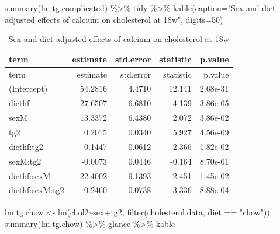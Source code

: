 \documentclass[
]{article}
\newenvironment{Shaded}{\begin{snugshade}}{\end{snugshade}}
\newcommand{\AttributeTok}[1]{\textcolor[rgb]{0.77,0.63,0.00}{#1}}
\newcommand{\DecValTok}[1]{\textcolor[rgb]{0.00,0.00,0.81}{#1}}
\newcommand{\FunctionTok}[1]{\textcolor[rgb]{0.00,0.00,0.00}{#1}}
\newcommand{\NormalTok}[1]{#1}
\newcommand{\OtherTok}[1]{\textcolor[rgb]{0.56,0.35,0.01}{#1}}
\newcommand{\SpecialCharTok}[1]{\textcolor[rgb]{0.00,0.00,0.00}{#1}}
\newcommand{\StringTok}[1]{\textcolor[rgb]{0.31,0.60,0.02}{#1}}
\begin{document}
\begin{Shaded}
\begin{Highlighting}[]
\FunctionTok{summary}\NormalTok{(lm.tg.complicated) }\SpecialCharTok{\%\textgreater{}\%}\NormalTok{ tidy }\SpecialCharTok{\%\textgreater{}\%} \FunctionTok{kable}\NormalTok{(}\AttributeTok{caption=}\StringTok{"Sex and diet adjusted effects of calcium on cholesterol at 18w"}\NormalTok{, }\AttributeTok{digits=}\DecValTok{50}\NormalTok{)}
\end{Highlighting}
\end{Shaded}

\begin{longtable}[]{@{}lrrrr@{}}
\caption{Sex and diet adjusted effects of calcium on cholesterol at
18w}\tabularnewline
\toprule()
term & estimate & std.error & statistic & p.value \\
\midrule()
\endfirsthead
\toprule()
term & estimate & std.error & statistic & p.value \\
\midrule()
\endhead
(Intercept) & 54.2816 & 4.4710 & 12.141 & 2.68e-31 \\
diethf & 27.6507 & 6.6810 & 4.139 & 3.86e-05 \\
sexM & 13.3372 & 6.4380 & 2.072 & 3.86e-02 \\
tg2 & 0.2015 & 0.0340 & 5.927 & 4.56e-09 \\
diethf:tg2 & 0.1447 & 0.0612 & 2.366 & 1.82e-02 \\
sexM:tg2 & -0.0073 & 0.0446 & -0.164 & 8.70e-01 \\
diethf:sexM & 22.4002 & 9.1393 & 2.451 & 1.45e-02 \\
diethf:sexM:tg2 & -0.2460 & 0.0738 & -3.336 & 8.88e-04 \\
\bottomrule()
\end{longtable}

\begin{Shaded}
\begin{Highlighting}[]
\NormalTok{lm.tg.chow }\OtherTok{\textless{}{-}} \FunctionTok{lm}\NormalTok{(chol2}\SpecialCharTok{\textasciitilde{}}\NormalTok{sex}\SpecialCharTok{+}\NormalTok{tg2, }\FunctionTok{filter}\NormalTok{(cholesterol.data, diet }\SpecialCharTok{==} \StringTok{"chow"}\NormalTok{))}
\FunctionTok{summary}\NormalTok{(lm.tg.chow) }\SpecialCharTok{\%\textgreater{}\%}\NormalTok{ glance }\SpecialCharTok{\%\textgreater{}\%}\NormalTok{ kable}
\end{Highlighting}
\end{Shaded}
\end{document}

